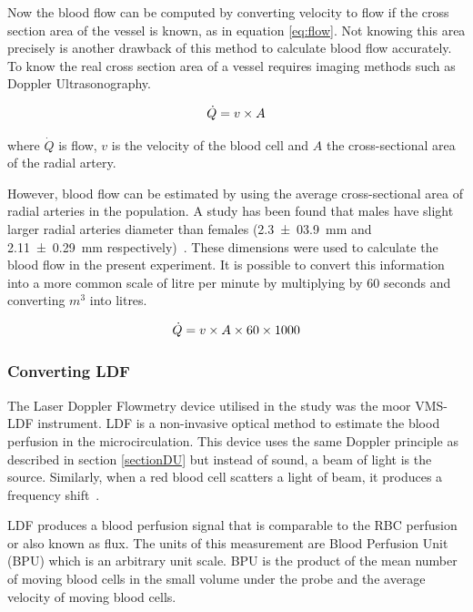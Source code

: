 Now the blood flow can be computed by converting velocity to flow if the cross section area of the vessel is known, as in equation \ref{eq:flow}. Not knowing this area precisely is another drawback of this method to calculate blood flow accurately. To know the real cross section area of a vessel requires imaging methods such as Doppler Ultrasonography. 

\begin{align}
	\label{eq:flow}
	\dot{Q} = v \times A \tagaddtext{[\si{\cubic\meter\per\second}]}
\end{align}

where $\dot{Q}$ is flow, $v$ is the velocity of the blood cell and $A$ the cross-sectional area of the radial artery.

However, blood flow can be estimated by using the average cross-sectional area of radial arteries in the population. A study has been found that males have slight larger radial arteries diameter than females (\SI{2.3(039)}{\mm} and \SI{2.11(029)}{\mm} respectively)~\cite{ashraf2010size}. These dimensions were used to calculate the blood flow in the present experiment. It is possible to convert this information into a more common scale of litre per minute by multiplying by 60 seconds and converting $m^3$ into litres. 

\begin{align}
\label{eq:flow_l/min}
\dot{Q} = v \times A \times 60 \times 1000 \tagaddtext{[\si{\cubic\meter\per\second}]}
\end{align}

\subsubsection{Converting LDF}
\label{section:ldf}
The Laser Doppler Flowmetry device utilised in the study was the moor VMS-LDF instrument. LDF is a non-invasive optical method to estimate the blood perfusion in the microcirculation. This device uses the same Doppler principle as described in section \ref{sectionDU} but instead of sound, a beam of light is the source. Similarly, when a red blood cell scatters a light of beam, it produces a frequency shift~\cite{fredriksson2007laser}. 

LDF produces a blood perfusion signal that is comparable to the RBC perfusion or also known as flux. The units of this measurement are Blood Perfusion Unit (BPU) which is an arbitrary unit scale. BPU is the product of the mean number of moving blood cells in the small volume under the probe and the average velocity of moving blood cells. 

